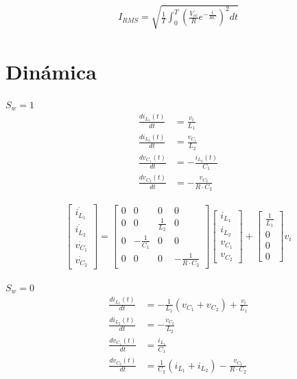 \begin{align*}
    I_{RMS}=\sqrt{\frac{1}{T}\int_{0}^{T}\left(\frac{V_{cc}}{R}e^{-\frac{t}{RC}}\right)^2dt}
\end{align*}

\section{Dinámica}

$S_w=1$
\begin{align*}
    \frac{di_{L_1}(t)}{dt}&=\frac{v_i}{L_1} \\ 
    \frac{di_{L_2}(t)}{dt}&=\frac{v_{C_1}}{L_2} \\ 
    \frac{dv_{C_1}(t)}{dt}&=-\frac{i_{L_2}(t)}{C_1} \\ 
    \frac{dv_{C_2}(t)}{dt}&=-\frac{v_{C_2}}{R\cdot C_2}
\end{align*}

\begin{align*}
    \begin{bmatrix}
        \dot{i_{L_1}} \\ 
        \dot{i_{L_2}} \\ 
        \dot{v_{C_1}} \\ 
        \dot{v_{C_2}}
    \end{bmatrix}
    =
    \begin{bmatrix}
        0 & 0 & 0 & 0 \\ 
        0 & 0 & \frac{1}{L_2} & 0 \\ 
        0 & -\frac{1}{C_1} & 0 & 0 \\ 
        0 & 0 & 0 & -\frac{1}{R\cdot C_2}
    \end{bmatrix}
    \begin{bmatrix}
        i_{L_1} \\ 
        i_{L_2} \\ 
        v_{C_1} \\ 
        v_{C_2}
    \end{bmatrix}
    +
    \begin{bmatrix}
        \frac{1}{L_1} \\ 
        0 \\ 
        0 \\ 
        0 
    \end{bmatrix}
    v_i
\end{align*}

$S_w=0$
\begin{align*}
    \frac{di_{L_1}(t)}{dt}&=-\frac{1}{L_1}(v_{C_1}+v_{C_2})+\frac{v_i}{L_1} \\ 
    \frac{di_{L_2}(t)}{dt}&=-\frac{v_{C_2}}{L_2} \\ 
    \frac{dv_{C_1}(t)}{dt}&=\frac{i_{L_1}}{C_1} \\ 
    \frac{dv_{C_2}(t)}{dt}&=\frac{1}{C_2}(i_{L_1}+i_{L_2})-\frac{v_{C_2}}{R \cdot C_2}
\end{align*}

